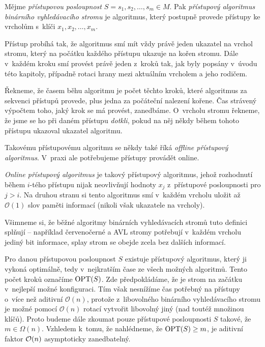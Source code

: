 \begin{definice}
Mějme \emph{přístupovou posloupnost} $S=s_1, s_2,\dots,s_m \in M$. Pak \emph{přístupový algoritmus
binárního vyhledávacího stromu} je algoritmus, který postupně provede přístupy
ke vrcholům s~klíči $x_1, x_2,\dots,x_m$.

Přístup probíhá tak, že algoritmus smí mít vždy právě jeden ukazatel na vrchol
stromu, který na počátku každého přístupu ukazuje na kořen stromu. Dále
v~každém kroku smí provést právě jeden z~kroků tak, jak byly popsány v~úvodu této kapitoly, případně rotaci hrany mezi aktuálním vrcholem a jeho rodičem. 

Řekneme, že časem běhu algoritmu je počet těchto kroků, které algoritmus za sekvenci
přístupů provede, plus jedna za počáteční nalezení kořene. Čas strávený výpočtem toho, jaký krok se má provést, zanedbáme. O~vrcholu stromu řekneme, že jsme se ho při daném
přístupu \emph{dotkli}, pokud na něj někdy během tohoto přístupu ukazoval
ukazatel algoritmu.  \end{definice}

Takovému přístupovému algoritmu se někdy také říká \emph{offline přístupový
algoritmus}. V~praxi ale potřebujeme přístupy provádět online.

\begin{definice}
\emph{Online přístupový algoritmus} je takový přístupový algoritmus, jehož
rozhodnutí během $i$-tého přístupu nijak neovlivňují hodnoty $x_j$ z~přístupové
posloupnosti pro $j>i$. Na druhou stranu si tento algoritmus smí v~každém
vrcholu uložit až $\mathcal O(1)$ slov paměti informací (nikoli však ukazatele
na vrcholy).
\end{definice}

Všimneme si, že běžné algoritmy binárních vyhledávacích stromů tuto definici
splňují -- například červenočerné a AVL stromy potřebují v~každém vrcholu
jediný bit informace, splay strom se obejde zcela bez dalších informací.

Pro danou přístupovou posloupnost $S$ existuje přístupový algoritmus, který ji
vykoná optimálně, tedy v~nejkratším čase ze všech možných algoritmů. Tento
počet kroků označíme $\operatorname{OPT}(S)$. Zde předpokládáme, že je strom na začátku
v~nejlepší možné konfiguraci. Tím však nesnížíme čas potřebný na přístupy o~více
než aditivní $\mathcal O(n)$, protože z~libovolného binárního vyhledávacího stromu je možné pomocí
$\mathcal O(n)$ rotací vytvořit libovolný jiný (nad toutéž množinou klíčů).
Proto budeme dále zkoumat pouze přístupové posloupnosti $S$ takové, že $m \in
\Omega(n)$. Vzhledem k~tomu, že nahlédneme, že $\operatorname{OPT}(S)\geq m$, je aditivní
faktor $\mathcal O(n)$ asymptoticky zanedbatelný. 


